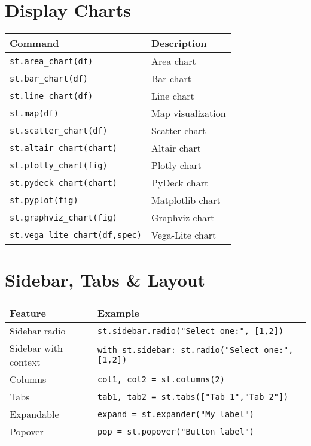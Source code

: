 \documentclass[11pt,a4paper]{article}
\begin{document}
\section*{Display Charts}
\begin{longtable}{|L{6cm}|L{10cm}|}
\hline
\textbf{Command} & \textbf{Description} \\ \hline
\verb|st.area_chart(df)| & Area chart \\ \hline
\verb|st.bar_chart(df)| & Bar chart \\ \hline
\verb|st.line_chart(df)| & Line chart \\ \hline
\verb|st.map(df)| & Map visualization \\ \hline
\verb|st.scatter_chart(df)| & Scatter chart \\ \hline
\verb|st.altair_chart(chart)| & Altair chart \\ \hline
\verb|st.plotly_chart(fig)| & Plotly chart \\ \hline
\verb|st.pydeck_chart(chart)| & PyDeck chart \\ \hline
\verb|st.pyplot(fig)| & Matplotlib chart \\ \hline
\verb|st.graphviz_chart(fig)| & Graphviz chart \\ \hline
\verb|st.vega_lite_chart(df,spec)| & Vega-Lite chart \\ \hline
\end{longtable}

\section*{Sidebar, Tabs \& Layout}
\begin{longtable}{|L{6cm}|L{10cm}|}
\hline
\textbf{Feature} & \textbf{Example} \\ \hline
Sidebar radio & \verb|st.sidebar.radio("Select one:", [1,2])| \\ \hline
Sidebar with context & \verb|with st.sidebar: st.radio("Select one:", [1,2])| \\ \hline
Columns & \verb|col1, col2 = st.columns(2)| \\ \hline
Tabs & \verb|tab1, tab2 = st.tabs(["Tab 1","Tab 2"])| \\ \hline
Expandable & \verb|expand = st.expander("My label")| \\ \hline
Popover & \verb|pop = st.popover("Button label")| \\ \hline
\end{longtable}
\end{document}
